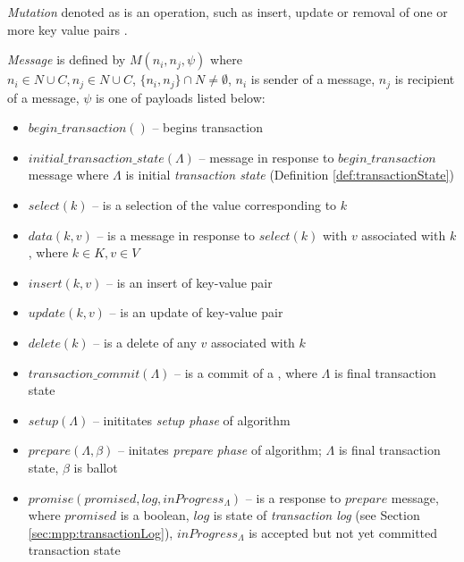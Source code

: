 \begin{definition}
  \label{def:mutation}
  \emph{Mutation} denoted as  is an operation, such as insert, update or removal of one or more key value pairs \kv.
\end{definition}

\begin{definition}
	\label{def:message}
	\emph{Message} is defined by $\mathit{M}(n_{i}, n_{j}, \psi)$ where 
	\\ $n_{i}\in\mathit{N}\cup\mathit{C}, n_{j}\in\mathit{N}\cup\mathit{C}$, $\{n_{i}, n_{j}\}\cap\mathit{N}\neq\emptyset$, $n_{i}$ is sender of a message, $n_{j}$ is recipient of a message, $\psi$ is one of payloads listed below:
	\begin{itemize}	
	\item $\mathit{begin\_transaction}()$ -- begins transaction \transaction 
	\item $\mathit{initial\_transaction\_state}(\Lambda)$ -- message in response to $\mathit{begin\_transaction}$ message where $\Lambda$ is initial \emph{transaction state} (Definition \ref{def:transactionState}) 
	\item $\mathit{select(k)}$ -- is a selection of the value corresponding to $k$ 
	\item $\mathit{data(k,v)}$ -- is a message in response to $\mathit{select(k)}$ with $v$ associated with $k$, where $k\in\mathit{K}, v\in\mathit{V}$ 
	\item $\mathit{insert(k,v)}$ -- is an insert of key-value pair 
	\item $\mathit{update(k,v)}$ -- is an update of key-value pair 
	\item $\mathit{delete(k)}$ -- is a delete of any $v$ associated with $k$
	\item $\mathit{transaction\_commit}(\Lambda)$ -- is a commit of a \transaction, where $\Lambda$ is final transaction state 
	\item $\mathit{setup}(\Lambda)$ -- inititates \emph{setup phase} of \mpt algorithm 
	\item $\mathit{prepare}(\Lambda, \beta)$ -- initates \emph{prepare phase} of \mpt algorithm; $\Lambda$ is final transaction state, $\beta$ is \paxos ballot 
	\item $\mathit{promise(promised, log, inProgress_{\Lambda})}$ -- is a response to $\mathit{prepare}$ message, where $\mathit{promised}$ is a boolean, $\mathit{log}$ is state of \emph{transaction log} (see Section \ref{sec:mpp:transactionLog}), $\mathit{inProgress_{\Lambda}}$ is accepted but not yet committed transaction state 

\end{itemize}
\end{definition}
